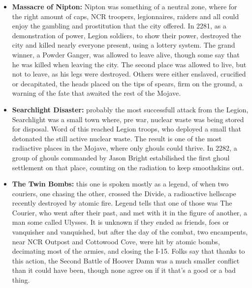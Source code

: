 \begin{itemize}
	\item \textbf{Massacre of Nipton:} Nipton was something of a neutral zone, where for the right amount of caps, NCR troopers, legionnaires, raiders and all could enjoy the gambling and prostitution that the city offered. In 2281, as a demonstration of power, Legion soldiers, to show their power, destroyed the city and killed nearly everyone present, using a lottery system. The grand winner, a Powder Ganger, was allowed to leave alive, though some say that he was killed when leaving the city. The second place was allowed to live, but not to leave, as his legs were destroyed. Others were either enslaved, crucified or decapitated, the heads placed on the tips of spears, firm on the ground, a warning of the fate that awaited the rest of the Mojave.
	
	\item \textbf{Searchlight Disaster:} probably the most successfull attack from the Legion, Searchlight was a small town where, pre war, nuclear waste was being stored for disposal. Word of this reached Legion troops, who deployed a small  that detonated the still active nuclear waste. The result is one of the most radiactive places in the Mojave, where only ghouls could thrive. In 2282, a group of ghouls commanded by Jason Bright estabilished the first ghoul settlement on that place, counting on the radiation to keep smoothskins out.
	
	\item \textbf{The Twin Bombs:} this one is spoken mostly as a legend, of when two couriers, one chasing the other, crossed the Divide, a radioactive hellscape recently destroyed by atomic fire. Legend tells that one of those was The Courier, who went after their past, and met with it in the figure of another, a man some called Ulysses. It is unknown if they ended as friends, foes or vanquisher and vanquished, but after the day of the combat, two encampents, near NCR Outpost and Cottowood Cove, were hit by atomic bombs, decimating most of the armies, and closing the I-15. Folks say that thanks to this action, the Second Battle of Hoover Damn was a much smaller conflict than it could have been, though none agree on if it that's a good or a bad thing.
\end{itemize}
